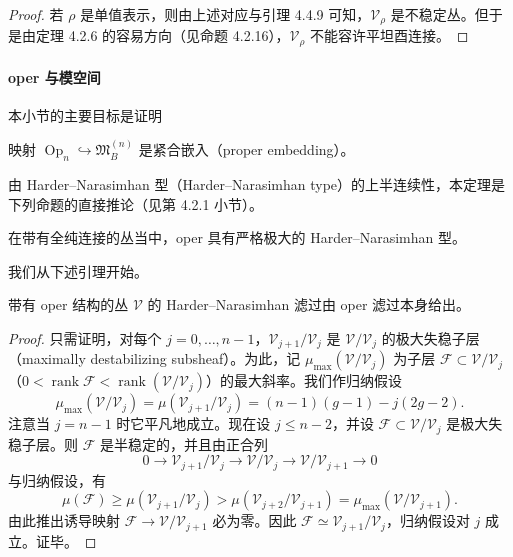 \begin{proof}
若 $\rho$ 是单值表示，则由上述对应与引理 4.4.9 可知，$\mathcal{V}_\rho$ 是不稳定丛。但于是由定理 4.2.6 的容易方向（见命题 4.2.16），$\mathcal{V}_\rho$ 不能容许平坦酉连接。
\end{proof}

\paragraph{oper 与模空间}

本小节的主要目标是证明

\begin{theorem}
映射 $\operatorname{Op}_n\hookrightarrow\mathfrak{M}_B^{(n)}$ 是紧合嵌入（proper embedding）。
\end{theorem}

由 Harder--Narasimhan 型（Harder--Narasimhan type）的上半连续性，本定理是下列命题的直接推论（见第 4.2.1 小节）。

\begin{proposition}
在带有全纯连接的丛当中，oper 具有严格极大的 Harder--Narasimhan 型。
\end{proposition}

我们从下述引理开始。

\begin{lemma}
带有 oper 结构的丛 $\mathcal{V}$ 的 Harder--Narasimhan 滤过由 oper 滤过本身给出。
\end{lemma}

\begin{proof}
只需证明，对每个 $j=0,\dots,n-1$，$\mathcal{V}_{j+1}/\mathcal{V}_j$ 是 $\mathcal{V}/\mathcal{V}_j$ 的极大失稳子层（maximally destabilizing subsheaf）。为此，记 $\mu_{\max}(\mathcal{V}/\mathcal{V}_j)$ 为子层 $\mathcal{F}\subset\mathcal{V}/\mathcal{V}_j$（$0<\operatorname{rank}\mathcal{F}<\operatorname{rank}(\mathcal{V}/\mathcal{V}_j)$）的最大斜率。我们作归纳假设
\[
\mu_{\max}(\mathcal{V}/\mathcal{V}_j)=\mu(\mathcal{V}_{j+1}/\mathcal{V}_j)=(n-1)(g-1)-j(2g-2).
\]
注意当 $j=n-1$ 时它平凡地成立。现在设 $j\le n-2$，并设 $\mathcal{F}\subset\mathcal{V}/\mathcal{V}_j$ 是极大失稳子层。则 $\mathcal{F}$ 是半稳定的，并且由正合列
\[
0\to\mathcal{V}_{j+1}/\mathcal{V}_j\to\mathcal{V}/\mathcal{V}_j\to\mathcal{V}/\mathcal{V}_{j+1}\to0
\]
与归纳假设，有
\[
\mu(\mathcal{F})\ge\mu(\mathcal{V}_{j+1}/\mathcal{V}_j)>\mu(\mathcal{V}_{j+2}/\mathcal{V}_{j+1})=\mu_{\max}(\mathcal{V}/\mathcal{V}_{j+1}).
\]
由此推出诱导映射 $\mathcal{F}\to\mathcal{V}/\mathcal{V}_{j+1}$ 必为零。因此 $\mathcal{F}\simeq\mathcal{V}_{j+1}/\mathcal{V}_j$，归纳假设对 $j$ 成立。证毕。
\end{proof}

